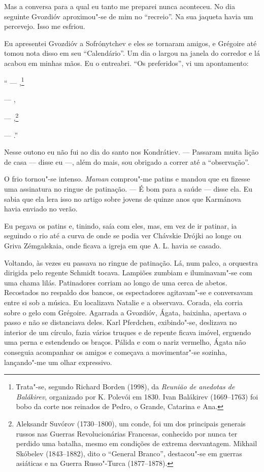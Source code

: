 Mas a conversa para a qual eu tanto me preparei nunca aconteceu. No dia
seguinte Gvozdióv aproximou"-se de mim no ``recreio''. Na sua jaqueta
havia um percevejo. Isso me esfriou.

Eu apresentei Gvozdióv a Sofrónytchev e eles se tornaram amigos, e
Grégoire até tomou nota disso em seu ``Calendário''. Um dia o largou na
janela do corredor e lá acabou em minhas mãos. Eu o entreabri. ``Os
preferidos'', vi um apontamento:

``\scalebox{.8}{LIVRO} --- \emph{\scalebox{.8}{BALÁKIREV}},\footnote{Тrata"-se, segundo Richard Borden
  (1998), da \emph{Reunião de anedotas de Balákirev}, organizado por K.
  Polevói em 1830. Ivan Balákirev (1669--1763) foi bobo da corte nos
  reinados de Pedro, o Grande, Catarina \scalebox{.8}{II} e Ana.}

\scalebox{.8}{CANÇÃO} --- \emph{\scalebox{.8}{PELO VOLGA}},

\scalebox{.8}{HERÓI} --- \scalebox{.8}{SUVÓROV E SKÓBELEV},\footnote{Aleksandr Suvórov (1730--1800),
  um conde, foi um dos principais generais russos nas Guerras
  Revolucionárias Francesas, conhecido por nunca ter perdido uma
  batalha, mesmo em condições de extrema desvantagem. Mikhail Skóbelev
  (1843--1882), dito o ``General Branco'', destacou"-se em guerras
  asiáticas e na Guerra Russo"-Turca (1877--1878).}

\scalebox{.8}{AMIGO} --- \scalebox{.8}{N. GVOZDIÓV}.''

Nesse outono eu não fui ao dia do santo nos Kondrátiev. --- Passaram
muita lição de casa --- disse eu ---, além do mais, sou obrigado a
correr até a ``observação''.

O frio tornou"-se intenso. \emph{Maman} comprou"-me patins e mandou que eu
fizesse uma assinatura no ringue de patinação. --- É bom para a saúde
--- disse ela. Eu sabia que ela lera isso no artigo sobre jovens de
quinze anos que Karmánova havia enviado no verão.

Eu pegava os patins e, tinindo, saía com eles, mas, em vez de ir
patinar, ia seguindo o rio até a curva de onde se podia ver Chávskie
Drójki ao longe ou Griva Zémgalskaia, onde ficava a igreja em que A. L.
havia se casado.

Voltando, às vezes eu passava no ringue de patinação. Lá, num palco, a
orquestra dirigida pelo regente Schmidt tocava. Lampiões zumbiam e
iluminavam"-se com uma chama lilás. Patinadores corriam ao longo de uma
cerca de abetos. Recostados no respaldo dos bancos, os espectadores
agitavam"-se e conversavam entre si sob a música. Eu localizava Natalie e
a observava. Corada, ela corria sobre o gelo com Grégoire. Agarrada a
Gvozdióv, Ágata, baixinha, apertava o passo e não se distanciava deles.
Karl Pferdchen, exibindo"-se, deslizava no interior de um círculo, fazia
vários truques e de repente ficava imóvel, erguendo uma perna e
estendendo os braços. Pálida e com o nariz vermelho, Ágata não conseguia
acompanhar os amigos e começava a movimentar"-se sozinha, lançando"-me um
olhar expressivo.

